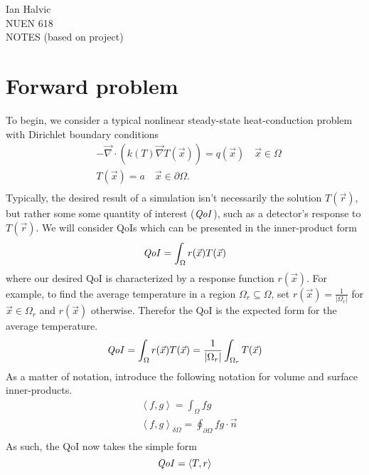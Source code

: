 \documentclass{article}
\newcommand{\vr}{\vec{r}}
\newcommand{\vx}{\vec{x}}
\newcommand{\bra}{\left\langle}
\newcommand{\ket}{\right\rangle}
\newcommand{\ketbd}{\right\rangle_{\delta \Omega}}
\renewcommand{\div}{\vec{\nabla} \cdot}
\newcommand{\grad}{\vec{\nabla}}
\newcommand{\qoi}{{\it QoI}\xspace}
\begin{document}
\begin{center}
Ian Halvic \\
NUEN 618\\
NOTES (based on project)\\
\end{center}

\section{Forward problem}
To begin, we consider a typical nonlinear steady-state heat-conduction problem with Dirichlet boundary conditions
\begin{equation}
\label{forwardSS}
\begin{split}
& - \div ( k(T) \grad T(\vx) ) = q(\vx) \quad \vx \in \Omega \\
&T(\vx)=a \quad \vx \in \partial \Omega .\\
\end{split}
\end{equation}
Typically, the desired result of a simulation isn't necessarily the solution $T(\vr)$, but rather some some quantity of interest ($\qoi$), such as a detector's response to $T(\vr)$. We will consider QoIs which can be presented in the inner-product form
\begin{equation}
\qoi = \int_{\Omega} r(\vx) T(\vx)
\end{equation}
where our desired QoI is characterized by a response function $r(\vx)$. For example, to find the average temperature in a region $\Omega_r \subseteq \Omega$, set $r(\vx)=\frac{1}{|\Omega_r|}$ for $\vx \in \Omega_r$ and $r(\vx)$ otherwise. Therefor the QoI is the expected form for the average temperature.
\begin{equation}
\qoi = \int_{\Omega} r(\vx) T(\vx) = \frac{1}{|\Omega_r|} \int_{\Omega_r} T(\vx) 
\end{equation}
As a matter of notation, introduce the following notation for volume and surface inner-products.
\begin{equation}
\begin{split}
&\bra f, g \ket = \int_\Omega f g \\
&\bra f, g \ketbd = \oint_{\partial \Omega} f g \cdot \vec{n} \\
\end{split}
\end{equation}
As such, the QoI now takes the simple form
\begin{equation}
\qoi = \bra T , r \ket
\end{equation}
\end{document}
